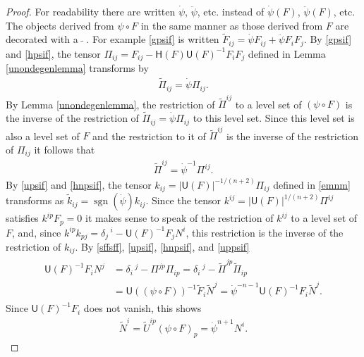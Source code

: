 \documentclass [leqno, 10pt]{amsart}
\theoremstyle{definition}
\numberwithin{equation}{section}
\newcommand{\U}{\mathsf{U}}
\renewcommand{\H}{\mathsf{H}}
\newcommand{\sff}{\Pi}
\newcommand{\sign}{\operatorname{sgn}}
\begin{document}
\begin{proof}
For readability there are written $\dot{\psi}$, $\ddot{\psi}$, etc. instead of $\dot{\psi}(F)$, $\ddot{\psi}(F)$, etc. 
The objects derived from $\psi \circ F$ in the same manner as those derived from $F$ are decorated with a $\tilde{\,\,\,}$. For example \eqref{gpsif} is written $\tilde{F}_{ij} = \dot{\psi}F_{ij} + \ddot{\psi}F_{i}F_{j}$. By \eqref{gpsif} and \eqref{hpsif}, the tensor $\sff_{ij} = F_{ij} - \H(F)\U(F)^{-1}F_{i}F_{j}$ defined in Lemma \ref{unondegenlemma} transforms by
\begin{align}\label{hnpsif}
\tilde{\sff}_{ij} = \dot{\psi}\sff_{ij}.
\end{align}
By Lemma \ref{unondegenlemma}, the restriction of $\tilde{\sff}^{ij}$ to a level set of $(\psi \circ F)$ is the inverse of the restriction of $\tilde{\sff}_{ij} = \dot{\psi}\sff_{ij}$ to this level set. Since this level set is also a level set of $F$ and the restriction to it of $\tilde{\sff}^{ij}$ is the inverse of the restriction of $\sff_{ij}$ it follows that 
\begin{align}\label{uppsif}
\tilde{\sff}^{ij} = \dot{\psi}^{-1}\sff^{ij}.
\end{align}
By \eqref{upsif} and \eqref{hnpsif}, the tensor $k_{ij} = |\U(F)|^{-1/(n+2)}\sff_{ij}$ defined in \eqref{emnm}
transforms as $\tilde{k}_{ij} = \sign(\dot{\psi})k_{ij}$. Since the tensor $k^{ij} = |\U(F)|^{1/(n+2)}\sff^{ij}$ satisfies $k^{ip}F_{p} = 0$ it makes sense to speak of the restriction of $k^{ij}$ to a level set of $F$, and, since $k^{ip}k_{pj} = \delta_{j}\,^{i} - \U(F)^{-1}F_{j}N^{i}$, this restriction is the inverse of the restriction of $k_{ij}$.
By \eqref{sffsff}, \eqref{upsif}, \eqref{hnpsif}, and \eqref{uppsif}
\begin{align}
\begin{split}
\U(F)^{-1}F_{i}N^{j} &= \delta_{i}\,^{j} - \sff^{jp}\sff_{ip} = \delta_{i}\,^{j} - \tilde{\sff}^{jp}\tilde{\sff}_{ip} \\ &= \U((\psi \circ F))^{-1}\tilde{F}_{i}\tilde{N}^{j} = \dot{\psi}^{-n-1}\U(F)^{-1}F_{i}\tilde{N}^{j}.
\end{split}
\end{align}
Since $\U(F)^{-1}F_{i}$ does not vanish, this shows
\begin{align}\label{psifn}
\tilde{N}^{i} = \tilde{U}^{ip}(\psi \circ F)_{p} = \dot{\psi}^{n+1}N^{i}.

\end{align}
\end{proof}
\end{document}

